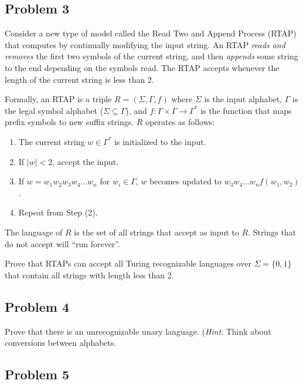 \documentclass{article}
\begin{document}

\newpage
\subsection*{Problem 3}

Consider a new type of model called the \textsf{Read Two and Append Process} (\textsf{RTAP}) that computes by continually modifying the input string. An \textsf{RTAP} \emph{reads and removes} the first two symbols of the current string, and then \emph{appends} some string to the end depending on the symbols read. The \textsf{RTAP} accepts whenever the length of the current string is less than 2.

Formally, an \textsf{RTAP} is a triple $R = (\Sigma, \Gamma, f)$ where $\Sigma$ is the input alphabet, $\Gamma$ is the legal symbol alphabet ($\Sigma \subseteq \Gamma$), and $f \colon \Gamma \times \Gamma \rightarrow \Gamma^*$ is the function that maps prefix symbols to new suffix strings. $R$ operates as follows:

\begin{enumerate}[(1)]
\item The current string $w \in \Gamma^*$ is initialized to the input.
\item If $|w| < 2$, accept the input.
\item If $w = w_1 w_2 w_3 w_4 ... w_n$ for $w_i \in \Gamma$, $w$ becomes updated to $w_3 w_4 ... w_n f(w_1, w_2)$.
\item Repeat from Step (2).
\end{enumerate}
The language of $R$ is the set of all strings that accept as input to $R$. Strings that do not accept will ``run forever''.

Prove that \textsf{RTAPs} can accept all Turing recognizable languages over $\Sigma= \{0,1\}$ that contain all strings with length less than 2.


\newpage
\subsection*{Problem 4}
Prove that there is an unrecognizable unary language. (\emph{Hint}: Think about conversions between alphabets.


\newpage
\subsection*{Problem 5}
\end{document}
